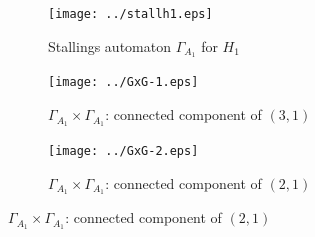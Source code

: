 \documentclass[envcountsect,compress]{beamer}
\theoremstyle{definition}
\numberwithin{equation}{section}
\newcommand{\G}{\Gamma }
\begin{document}
\begin{frame}
  \frametitle{}
\begin{figure}
\begin{center}
\begin{subfigure}[b]{.25\columnwidth}
\texttt{[image: ../stallh1.eps]}
\caption{Stallings automaton $\G_{A_1}$ for $H_1$}
\label{fig:stall1}
\end{subfigure}
\hspace{5mm}
\begin{subfigure}[b]{.25\columnwidth}
\texttt{[image: ../GxG-1.eps]}
\caption{$\G_{A_1}\times \G_{A_1}$: connected component of $(3,1)$}
\label{fig:GxG-1}
\end{subfigure}
\hspace{5mm}
\begin{subfigure}[b]{.25\columnwidth}
\texttt{[image: ../GxG-2.eps]}
\caption{$\G_{A_1}\times \G_{A_1}$: connected component of $(2,1)$}
\label{fig:GxG-2}
\end{subfigure}
\end{center}
\end{figure}

\end{frame}
\begin{frame}
  \frametitle{}

\end{frame}
\begin{frame}
  \frametitle{}

\end{frame}
\end{document}
